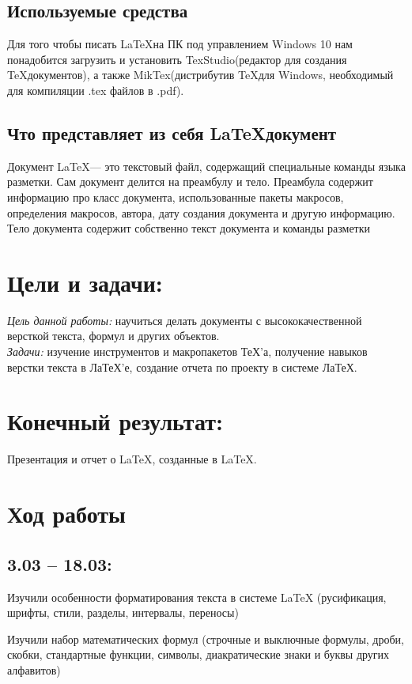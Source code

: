 \documentclass{article}
\begin{document}
\subsection*{Используемые средства}

Для того чтобы писать \LaTeX на ПК под управлением Windows 10 нам понадобится загрузить и установить TexStudio(редактор для создания \TeX документов), а также MikTex(дистрибутив \TeX для Windows, необходимый для компиляции .tex файлов в .pdf).

\subsection*{Что представляет из себя \LaTeX документ}
Документ \LaTeX — это текстовый файл, содержащий специальные команды языка разметки. Сам документ делится на преамбулу и тело. Преамбула содержит информацию про класс документа, использованные пакеты макросов, определения макросов, автора, дату создания документа и другую информацию. Тело документа содержит собственно текст документа и команды разметки
	\section*{Цели и задачи:}
	
	
	\emph{Цель данной работы:} научиться делать документы с высококачественной версткой текста, формул и других объектов.\\
	
	
	\noindent\emph{Задачи:} изучение инструментов и макропакетов ТеХ'а, получение навыков верстки текста в ЛаТеХ'е, создание отчета по проекту в системе ЛаТеХ.
	
	
	\section*{Конечный результат:}
	Презентация и отчет о \LaTeX, созданные в \LaTeX.
	
	\section*{Ход работы}
	\subsection*{3.03 – 18.03:}
	
	Изучили особенности форматирования текста в системе LaTeX (русификация, шрифты, стили, разделы, интервалы, переносы)
	
	Изучили набор математических формул (строчные и выключные формулы, дроби, скобки, стандартные функции, символы, диакратические знаки и буквы других алфавитов)
	
\end{document}
